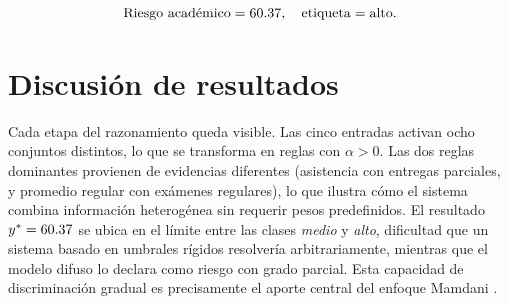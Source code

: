 \begin{equation*}
\text{Riesgo académico} = 60.37,\quad \text{etiqueta} = \text{alto}.
\end{equation*}

\section{Discusión de resultados}

Cada etapa del razonamiento queda visible. Las cinco entradas activan ocho conjuntos distintos, lo que se transforma en \CaseActiveRulesCountestudiantetipicoriesgoalto{} reglas con $\alpha > 0$. Las dos reglas dominantes provienen de evidencias diferentes (asistencia con entregas parciales, y promedio regular con exámenes regulares), lo que ilustra cómo el sistema combina información heterogénea sin requerir pesos predefinidos. El resultado $y^*=60.37$ se ubica en el límite entre las clases \emph{medio} y \emph{alto}, dificultad que un sistema basado en umbrales rígidos resolvería arbitrariamente, mientras que el modelo difuso lo declara como riesgo \emph{\CaseLabelIdestudiantetipicoriesgoalto{}} con grado parcial. Esta capacidad de discriminación gradual es precisamente el aporte central del enfoque Mamdani \citep{mamdani1975experiment,sugeno1985industrial}.

